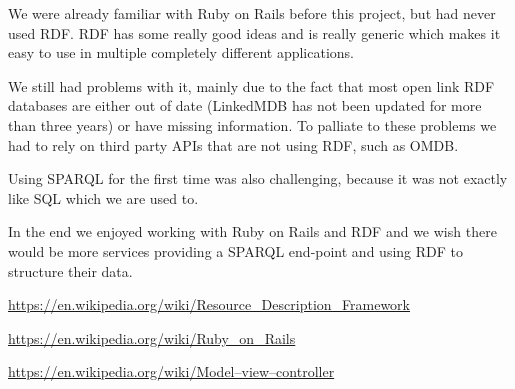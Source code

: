 \documentclass[12pt,a4paper]{article}
\begin{document}
We were already familiar with Ruby on Rails before this project, but had never used RDF. RDF has some really good ideas and is really generic which makes it easy to use in multiple completely different applications. 

We still had problems with it, mainly due to the fact that most open link RDF databases are either out of date (LinkedMDB has not been updated for more than three years) or have missing information. To palliate to these problems we had to rely on third party APIs that are not using RDF, such as OMDB.

Using SPARQL for the first time was also challenging, because it was not exactly like SQL which we are used to.

In the end we enjoyed working with Ruby on Rails and RDF and we wish there would be more services providing a SPARQL end-point and using RDF to structure their data.




\newpage
\begin{thebibliography}{20}

\href{https://en.wikipedia.org/wiki/Resource\_Description\_Framework}{https://en.wikipedia.org/wiki/Resource\_Description\_Framework}

\href{https://en.wikipedia.org/wiki/Ruby\_on\_Rails}{https://en.wikipedia.org/wiki/Ruby\_on\_Rails}

\href{https://en.wikipedia.org/wiki/Model\%E2\%80\%93view\%E2\%80\%93controller}{https://en.wikipedia.org/wiki/Model–view–controller}
\end{thebibliography}
\end{document}
